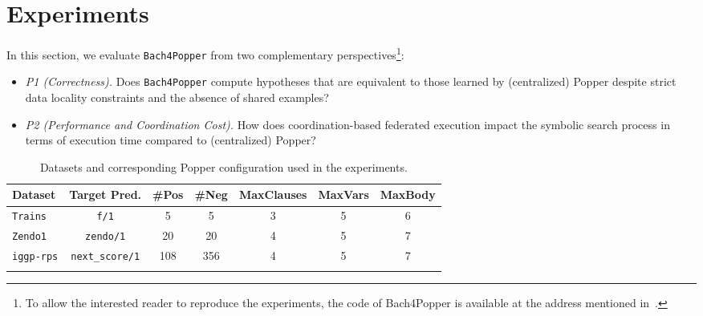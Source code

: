 \section{Experiments}
\label{sect-experiments}


In this section, we evaluate \texttt{Bach4Popper} from two complementary perspectives\footnote{To allow the interested reader to reproduce the experiments, the code of Bach4Popper is available at the address mentioned in~\cite{Bach4Popper-code}.}:

\begin{itemize}
    \item  \textit{P1 (Correctness).}  Does \texttt{Bach4Popper} compute hypotheses that are equivalent to those learned by (centralized) Popper despite strict data locality constraints and the absence of shared examples?
    \item  \textit{P2 (Performance and Coordination Cost).}  How does coordination-based federated execution impact the symbolic search process in terms of execution time compared to (centralized) Popper?
\end{itemize}

\noindent




\begin{table}[!t]
\centering
\begin{tabular}{lcccccc}
\toprule
\textbf{Dataset} & \textbf{Target Pred.} & \textbf{\#Pos} & \textbf{\#Neg} & \textbf{MaxClauses} & \textbf{MaxVars} & \textbf{MaxBody} \\
\midrule
\texttt{Trains}   & \texttt{f/1}              & 5   & 5   & 3 & 5 & 6 \\
\texttt{Zendo1}   & \texttt{zendo/1}          & 20  & 20  & 4 & 5 & 7 \\
\texttt{iggp-rps} & \texttt{next\_score/1}    & 108 & 356 & 4 & 5 & 7 \\
\bottomrule \\

\end{tabular}
\caption{Datasets and corresponding Popper configuration used in the experiments.}
\label{tab:datasets-config}
\end{table}


